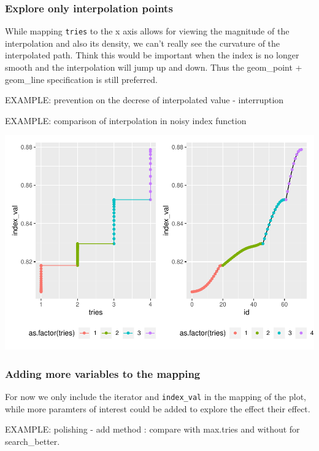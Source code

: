 \documentclass[12pt]{article}
\begin{document}
\hypertarget{explore-only-interpolation-points}{%
\subsubsection{Explore only interpolation
points}\label{explore-only-interpolation-points}}

While mapping \texttt{tries} to the x axis allows for viewing the
magnitude of the interpolation and also its density, we can't really see
the curvature of the interpolated path. Think this would be important
when the index is no longer smooth and the interpolation will jump up
and down. Thus the geom\_point + geom\_line specification is still
preferred.

EXAMPLE: prevention on the decrese of interpolated value - interruption

EXAMPLE: comparison of interpolation in noisy index function

\includegraphics{paper_files/figure-latex/unnamed-chunk-7-1.pdf}

\hypertarget{adding-more-variables-to-the-mapping}{%
\subsubsection{Adding more variables to the
mapping}\label{adding-more-variables-to-the-mapping}}

For now we only include the iterator and \texttt{index\_val} in the
mapping of the plot, while more paramters of interest could be added to
explore the effect their effect.

EXAMPLE: polishing - add method : compare with max.tries and without for
search\_better.
\end{document}
